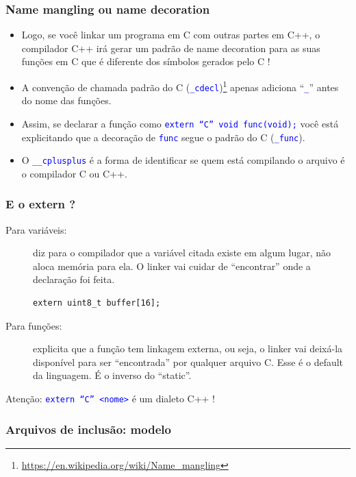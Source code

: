 \documentclass{beamer}
\begin{document}
\begin{frame}[fragile]
	\frametitle{Name mangling ou name decoration}
		\begin{itemize}
			\item Logo, se você linkar um programa em C com outras partes em C++, o compilador C++ irá gerar um padrão de name decoration para as suas funções em C que é diferente dos símbolos gerados pelo C !
           \item A convenção de chamada padrão do C (\texttt{\textcolor{blue}{\_cdecl}})\footnote{\tiny{\url{https://en.wikipedia.org/wiki/Name_mangling}}} apenas adiciona ``\texttt{\textcolor{blue}{\_}}'' antes do nome das funções.
           \item Assim, se declarar a função como \texttt{\textcolor{blue}{extern ``C'' void func(void);}} você está explicitando que a decoração de \texttt{\textcolor{blue}{func}} segue o padrão do C (\texttt{\textcolor{blue}{\_func}}).
           \item O \texttt{\textcolor{blue}{\_\_cplusplus}} é a forma de identificar se quem está compilando o arquivo é o compilador C ou C++.
		\end{itemize}
\end{frame}

\begin{frame}[fragile]
	\frametitle{E o extern ?}
	\begin{description}
	\item [Para variáveis:] diz para o compilador que a variável citada existe em algum lugar, não aloca memória para ela. O linker vai cuidar de ``encontrar'' onde a declaração foi feita.
	\begin{verbatim}
extern uint8_t buffer[16];
	\end{verbatim}
	\item [Para funções:]	explicita que a função tem linkagem externa, ou seja, o linker vai deixá-la disponível para ser ``encontrada'' por qualquer arquivo C. Esse é o default da linguagem. É o inverso do ``static''.
	\end{description}
		\vspace*{0.5cm}
		\begin{center}
		Atenção: \texttt{\textcolor{blue}{extern ``C'' <nome>}} é um dialeto C++ !
	\end{center}	
\end{frame}

\begin{frame}
	\frametitle{Arquivos de inclusão: modelo}
	
\end{frame}
\end{document}
